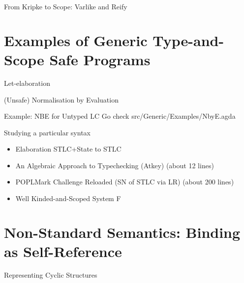 \documentclass{beamer}
\begin{document}
\begin{frame}{From Kripke to Scope: Varlike and Reify}
\end{frame}

\section{Examples of Generic Type-and-Scope Safe Programs}

\begin{frame}{Let-elaboration}
\end{frame}

\begin{frame}{(Unsafe) Normalisation by Evaluation}
  \hspace{-50pt}\begin{minipage}{0.9\textwidth}
  \end{minipage}
\end{frame}

\begin{frame}{Example: NBE for Untyped LC}
  Go check src/Generic/Examples/NbyE.agda
\end{frame}

\begin{frame}{Studying a particular syntax}
  \begin{itemize}
    \item Elaboration STLC+State to STLC
    \item An Algebraic Approach to Typechecking (Atkey) (about 12 lines)
    \item POPLMark Challenge Reloaded (SN of STLC via LR) (about 200 lines)
    \item Well Kinded-and-Scoped System F
  \end{itemize}
\end{frame}

\section{Non-Standard Semantics: Binding as Self-Reference}

\begin{frame}{Representing Cyclic Structures}
\end{frame}
\end{document}
